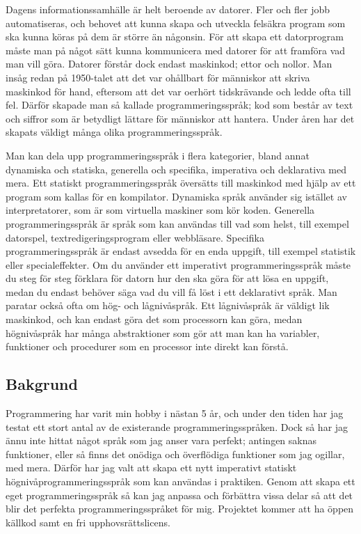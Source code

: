 \documentclass{theme}
\begin{document}
Dagens informationssamhälle är helt beroende av datorer. Fler och fler
jobb automatiseras, och behovet att kunna skapa och utveckla felsäkra program 
som ska kunna köras på dem är större än någonsin. För att skapa ett 
datorprogram måste man på något sätt kunna kommunicera med datorer för att 
framföra vad man vill göra. Datorer förstår dock endast maskinkod; ettor och
nollor. Man insåg redan på 1950-talet att det var ohållbart för människor att
skriva maskinkod för hand, eftersom att det var oerhört tidskrävande och ledde
ofta till fel. Därför skapade man så kallade programmeringsspråk; kod som
består av text och siffror som är betydligt lättare för människor att hantera.
Under åren har det skapats väldigt många olika programmeringsspråk. 

Man kan dela upp programmeringsspråk i flera kategorier, bland annat dynamiska
och statiska, generella och specifika, imperativa och deklarativa med mera. Ett 
statiskt programmeringsspråk översätts till maskinkod med hjälp av ett program
som kallas för en kompilator. Dynamiska språk använder sig istället av interpretatorer, som 
är som virtuella maskiner som kör koden. Generella programmeringsspråk är språk 
som kan användas till vad som helst, till exempel datorspel, 
textredigeringsprogram eller webbläsare. Specifika programmeringsspråk är 
endast avsedda för en enda uppgift, till exempel statistik eller 
specialeffekter. Om du använder ett imperativt programmeringsspråk måste du 
steg för steg förklara för datorn hur den ska göra för att lösa en uppgift, 
medan du endast behöver säga vad du vill få löst i ett deklarativt språk. Man 
paratar också ofta om hög- och lågnivåspråk. Ett lågnivåspråk är väldigt lik 
maskinkod, och kan endast göra det som processorn kan göra, medan högnivåspråk 
har många abstraktioner som gör att man kan ha variabler, funktioner och 
procedurer som en processor inte direkt kan förstå.

\subsection{Bakgrund}

Programmering har varit min hobby i nästan 5 år, och under den tiden har jag 
testat ett stort antal av de existerande programmeringsspråken. Dock så har jag 
ännu inte hittat något språk som jag anser vara perfekt; antingen saknas 
funktioner, eller så finns det onödiga och överflödiga funktioner som jag 
ogillar, med mera. Därför har jag valt att skapa ett nytt imperativt statiskt
högnivåprogrammeringsspråk som kan användas i praktiken. Genom att skapa ett 
eget programmeringsspråk så kan jag anpassa och förbättra vissa delar så att det
blir det perfekta programmeringsspråket för mig.  Projektet kommer att ha öppen 
källkod samt en fri upphovsrättslicens. 
\end{document}
